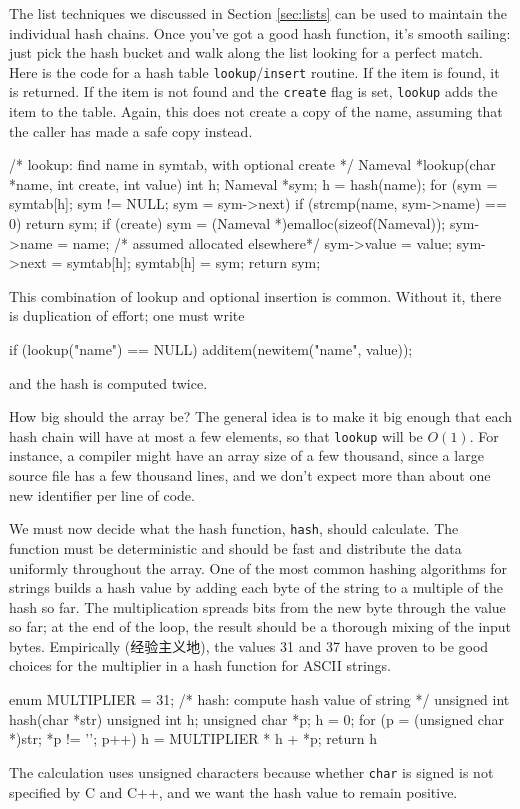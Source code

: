 The list techniques we discussed in Section \ref{sec:lists} can be used to
maintain the individual hash chains. Once you've got a good hash function,
it's smooth sailing: just pick the hash bucket and walk along the list
looking for a perfect match. Here is the code for a hash table
\verb'lookup'/\verb'insert' routine. If the item is found, it is returned.
If the item is not found and the \verb'create' flag is set, \verb'lookup'
adds the item to the table.  Again, this does not create a copy of the
name, assuming that the caller has made a safe copy instead.
\begin{wellcode}
    /* lookup: find name in symtab, with optional create */
    Nameval *lookup(char *name, int create, int value)
    {
        int h;
        Nameval *sym;
        h = hash(name);
        for (sym = symtab[h]; sym != NULL; sym = sym->next)
            if (strcmp(name, sym->name) == 0)
                return sym;
        if (create) {
            sym = (Nameval *)emalloc(sizeof(Nameval));
            sym->name = name;   /* assumed allocated elsewhere*/
            sym->value = value;
            sym->next = symtab[h];
            symtab[h] = sym;
        }
        return sym;
    }
\end{wellcode}
This combination of lookup and optional insertion is common. Without it,
there is duplication of effort; one must write 
\begin{wellcode}
    if (lookup("name") == NULL)
        additem(newitem("name", value));
\end{wellcode}
and the hash is computed twice.

How big should the array be? The general idea is to make it big enough that
each hash chain will have at most a few elements, so that \verb'lookup' will be
$O(1)$. For instance, a compiler might have an array size of a few
thousand, since a large source file has a few thousand lines, and we don't
expect more than about one new identifier per line of code.

We must now decide what the hash function, \verb'hash', should calculate.
The function must be deterministic and should be fast and distribute the
data uniformly throughout the array. One of the most common hashing
algorithms for strings builds a hash value by adding each byte of the
string to a multiple of the hash so far. The multiplication spreads bits
from the new byte through the value so far; at the end of the loop, the
result should be a thorough mixing of the input bytes. Empirically
(经验主义地), the values 31 and 37 have proven to be good choices for the
multiplier in a hash function for ASCII strings.
\begin{wellcode}
    enum {MULTIPLIER = 31};
    /* hash: compute hash value of string */
    unsigned int hash(char *str)
    {
        unsigned int h;
        unsigned char *p;
        h = 0;
        for (p = (unsigned char *)str; *p != '\0'; p++)
            h = MULTIPLIER * h + *p;
        return h %
    }
\end{wellcode}
The calculation uses unsigned characters because whether \verb'char' is
signed is not specified by C and C++, and we want the hash value to remain
positive.

